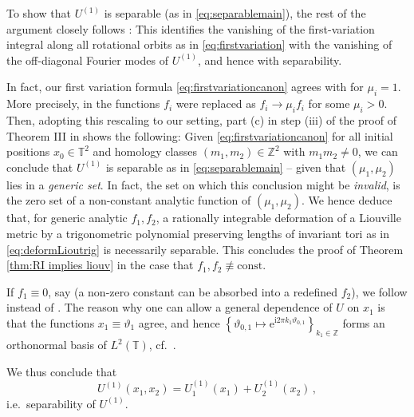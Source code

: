 \documentclass[11pt,letterpaper,oneside]{amsart}
\newcommand{\Z}{\mathbb{Z}}
\newcommand{\T}{\mathbb{T}}
\theoremstyle{definition}
\theoremstyle{remark}
\theoremstyle{definition}
\theoremstyle{remark}
\begin{document}
\medskip

To show that $U^{(1)}$ is separable (as in \eqref{eq:separablemain}), the rest of the argument closely follows \cite[Proof of Theorem III in Section 4.3]{henheik2025deformational}: This identifies the vanishing of the first-variation integral along all rotational orbits as in \eqref{eq:firstvariation} with the vanishing of the off-diagonal Fourier modes of $U^{(1)}$, and hence with separability. 

\medskip

In fact, our first variation formula \eqref{eq:firstvariationcanon} agrees with \cite[Eq.~(4.15)]{henheik2025deformational} for $\mu_i = 1$. More precisely, in \cite{henheik2025deformational} the functions $f_i$ were replaced as $f_i \to \mu_i f_i$ for some $\mu_i >0$. Then, adopting this rescaling to our setting, part (c) in step (iii) of the proof of Theorem III in \cite{henheik2025deformational} shows the following: Given \eqref{eq:firstvariationcanon} for all initial positions $x_0 \in \T^2$ and homology classes $(m_1, m_2) \in \Z^2$ with $m_1 m_2 \neq 0$, we can conclude that $U^{(1)}$ is separable as in \eqref{eq:separablemain} -- given that $(\mu_1, \mu_2)$ lies in a \emph{generic set}. In fact, the set on which this conclusion might be \emph{invalid}, is the zero set of a non-constant analytic function of $(\mu_1, \mu_2)$. We hence deduce that, for generic analytic $f_1, f_2$, a rationally integrable deformation of a Liouville metric by a trigonometric polynomial preserving lengths of invariant tori as in \eqref{eq:deformLioutrig} is necessarily separable. This concludes the proof of Theorem \ref{thm:RI implies liouv} in the case that $f_1, f_2 \not\equiv \mathrm{const}$.

\medskip

If $f_1 \equiv 0$, say (a non-zero constant can be absorbed into a redefined $f_2$), we follow \cite[Proof of Theorem II in Section 4.2]{henheik2025deformational} instead of \cite[Proof of Theorem III in Section 4.3]{henheik2025deformational}. The reason why one can allow a general dependence of $U$ on $x_1$ is that the functions $x_1 \equiv \vartheta_1$ agree, and hence  $\left\{\vartheta_{0,1} \mapsto \mathrm{e}^{\mathrm{i} 2 \pi k_1 \vartheta_{0,1}} \right\}_{k_1 \in \Z}$ forms an orthonormal basis of $L^2(\T)$, cf.~\cite[Step (iii) of the proof of Theorem II in Section 4.2]{henheik2025deformational}. 

\medskip

We thus conclude that
\begin{equation*}
    U^{(1)}(x_1, x_2) = U^{(1)}_1(x_1) + U^{(1)}_2(x_2) \,, 
\end{equation*}
i.e.~separability of $U^{(1)}$. 
\end{document}
